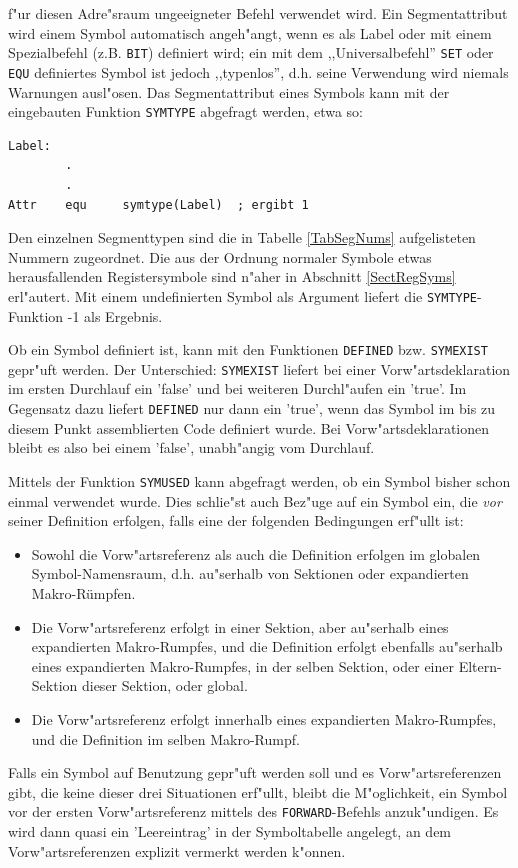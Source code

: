\documentclass[12pt,a4paper,twoside]{report}
\newcommand{\tty}[1]{{\tt #1}}
\begin{document}
f"ur diesen Adre"sraum ungeeigneter Befehl verwendet wird.  Ein
Segmentattribut wird einem Symbol automatisch angeh"angt, wenn es als Label
oder mit einem Spezialbefehl (z.B. \tty{BIT}) definiert wird; ein mit
dem ,,Universalbefehl'' \tty{SET} oder \tty{EQU} definiertes Symbol ist
jedoch ,,typenlos'', d.h. seine Verwendung wird niemals Warnungen
ausl"osen.  Das Segmentattribut eines Symbols kann mit der eingebauten
Funktion \tty{SYMTYPE} abgefragt werden, etwa so:
\begin{verbatim}
Label:
        .
        .
Attr    equ     symtype(Label)  ; ergibt 1
\end{verbatim}
Den einzelnen Segmenttypen sind die in Tabelle \ref{TabSegNums}
aufgelisteten Nummern zugeordnet.  Die aus der Ordnung normaler Symbole
etwas herausfallenden Registersymbole sind n"aher in Abschnitt
\ref{SectRegSyms} erl"autert.  Mit einem undefinierten Symbol als Argument
liefert die \tty{SYMTYPE}-Funktion -1 als Ergebnis.

Ob ein Symbol definiert ist, kann mit den Funktionen \tty{DEFINED} bzw.
\tty{SYMEXIST} gepr"uft werden.  Der Unterschied: \tty{SYMEXIST} liefert
bei einer Vorw"artsdeklaration im ersten Durchlauf ein 'false' und bei
weiteren Durchl"aufen ein 'true'.  Im Gegensatz dazu liefert \tty{DEFINED} nur
dann ein 'true', wenn das Symbol im bis zu diesem Punkt assemblierten Code
definiert wurde.  Bei Vorw"artsdeklarationen bleibt es also bei einem 'false',
unabh"angig vom Durchlauf.

\label{sect_symused}
Mittels der Funktion \tty{SYMUSED} kann abgefragt werden, ob ein Symbol
bisher schon einmal verwendet wurde.  Dies schlie"st auch Bez"uge auf
ein Symbol ein, die {\em vor} seiner Definition erfolgen, falls
eine der folgenden Bedingungen erf"ullt ist:
\begin{itemize}
\item{Sowohl die Vorw"artsreferenz als auch die Definition erfolgen im
      globalen Symbol-Namensraum, d.h. au"serhalb von Sektionen oder
      expandierten Makro-Rümpfen.}
\item{Die Vorw"artsreferenz erfolgt in einer Sektion, aber au"serhalb
      eines expandierten Makro-Rumpfes, und die Definition erfolgt ebenfalls
      au"serhalb eines expandierten Makro-Rumpfes, in der selben Sektion, oder
      einer Eltern-Sektion dieser Sektion, oder global.}
\item{Die Vorw"artsreferenz erfolgt innerhalb eines expandierten Makro-Rumpfes,
      und die Definition im selben Makro-Rumpf.}
\end{itemize}
Falls ein Symbol auf Benutzung gepr"uft werden soll und es Vorw"artsreferenzen
gibt, die keine dieser drei Situationen erf"ullt, bleibt die M"oglichkeit,
ein Symbol vor der ersten Vorw"artsreferenz mittels des \tty{FORWARD}-Befehls
anzuk"undigen.  Es wird dann quasi ein 'Leereintrag' in der Symboltabelle
angelegt, an dem Vorw"artsreferenzen explizit vermerkt werden k"onnen.
\end{document}
